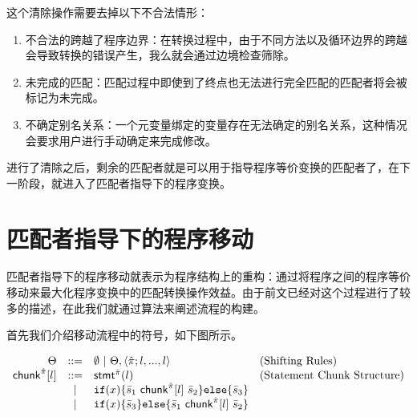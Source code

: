 \begin{center}
\DP
\end{center}

这个清除操作需要去掉以下不合法情形：
\begin{enumerate}
\item 不合法的跨越了程序边界：在转换过程中，由于不同方法以及循环边界的跨越会导致转换的错误产生，我么就会通过边境检查筛除。
\item 未完成的匹配：匹配过程中即使到了终点也无法进行完全匹配的匹配者将会被标记为未完成。
\item 不确定别名关系：一个元变量绑定的变量存在无法确定的别名关系，这种情况会要求用户进行手动确定来完成修改。
\end{enumerate}

进行了清除之后，剩余的匹配者就是可以用于指导程序等价变换的匹配者了，在下一阶段，就进入了匹配者指导下的程序变换。

\section{匹配者指导下的程序移动}

匹配者指导下的程序移动就表示为程序结构上的重构：通过将程序之间的程序等价移动来最大化程序变换中的匹配转换操作效益。由于前文已经对这个过程进行了较多的描述，在此我们就通过算法来阐述流程的构建。

首先我们介绍移动流程中的符号，如下图所示。
\newcommand{\s}{s}

\[
\begin{array}{rcll}
	\Theta &::=& \emptyset ~|~ \Theta,\langle{\hat\pi;l,...,l}\rangle &\text{(Shifting Rules)}\\
	\mathsf{chunk}^{\hat\pi}[l] &::=&\mathsf{stmt}^{\hat\pi}(l)& \text{(Statement Chunk Structure)}\\
					  & | & \mathtt{if}(x)\{\bar{s}_1~\mathsf{chunk}^{\hat\pi}[l]~\bar{s}_2\}\mathtt{else}\{\bar{s}_3\}\\
					  & | & \mathtt{if}(x)\{\bar{s}_3\}\mathtt{else}\{\bar{s}_1~\mathsf{chunk}^{\hat\pi}[l]~\bar{s}_2\}\\
\end{array}
\]

